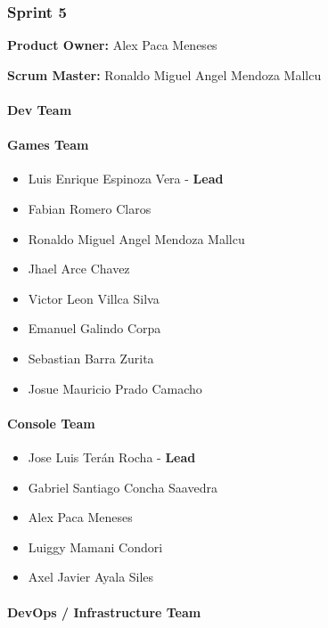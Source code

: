 \hypertarget{sprint5}{
\subsubsection{\texorpdfstring{\textbf{Sprint
5}}{Sprint 5}}\label{sprint5}}

\textbf{Product Owner: }
Alex Paca Meneses

\textbf{Scrum Master: }
Ronaldo Miguel Angel Mendoza Mallcu

\hypertarget{devteam-5}{
\paragraph{\texorpdfstring{\textbf{Dev
Team}}{Dev Team}}\label{devteam-5}}

\paragraph{Games Team}\label{games-team-5}

\begin{itemize}
\tightlist
\item
  Luis Enrique Espinoza Vera - \textbf{Lead}
\item
  Fabian Romero Claros
\item
  Ronaldo Miguel Angel Mendoza Mallcu
\item
  Jhael Arce Chavez
\item
  Victor Leon Villca Silva
\item
  Emanuel Galindo Corpa
\item
  Sebastian Barra Zurita
\item
  Josue Mauricio Prado Camacho
\end{itemize}

\paragraph{Console Team}\label{console-team-5}

\begin{itemize}
\tightlist
\item
  Jose Luis Terán Rocha - \textbf{Lead}
\item
  Gabriel Santiago Concha Saavedra
\item
  Alex Paca Meneses
\item
  Luiggy Mamani Condori
\item
  Axel Javier Ayala Siles
\end{itemize}

\paragraph{DevOps / Infrastructure Team}\label{devops-team-5}

